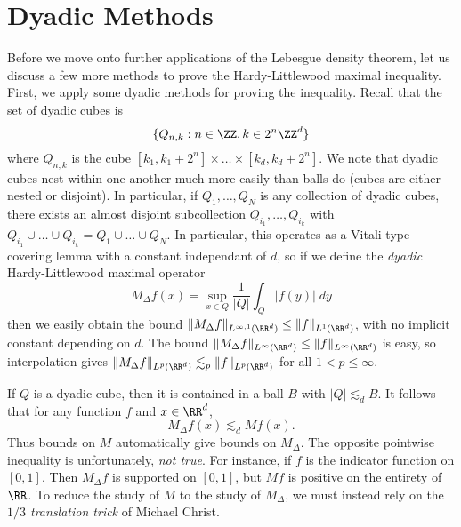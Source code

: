 \section{Dyadic Methods}

Before we move onto further applications of the Lebesgue density theorem, let us discuss a few more methods to prove the Hardy-Littlewood maximal inequality. First, we apply some dyadic methods for proving the inequality. Recall that the set of dyadic cubes is
%
\[ \{ Q_{n,k} : n \in \ZZ, k \in 2^n \ZZ^d \} \]
%
where $Q_{n,k}$ is the cube $[k_1, k_1 + 2^n] \times \dots \times [k_d, k_d + 2^n]$. We note that dyadic cubes nest within one another much more easily than balls do (cubes are either nested or disjoint). In particular, if $Q_1,\dots,Q_N$ is any collection of dyadic cubes, there exists an almost disjoint subcollection $Q_{i_1}, \dots, Q_{i_k}$ with $Q_{i_1} \cup \dots \cup Q_{i_k} = Q_1 \cup \dots \cup Q_N$. In particular, this operates as a Vitali-type covering lemma with a constant independant of $d$, so if we define the \emph{dyadic} Hardy-Littlewood maximal operator
%
\[ M_\Delta f(x) = \sup_{x \in Q} \frac{1}{|Q|} \int_Q |f(y)|\; dy \]
%
then we easily obtain the bound $\| M_\Delta f \|_{L^{\infty,1}(\RR^d)} \leq \| f \|_{L^1(\RR^d)}$, with no implicit constant depending on $d$. The bound $\| M_\Delta f \|_{L^\infty(\RR^d)} \leq \| f \|_{L^\infty(\RR^d)}$ is easy, so interpolation gives $\| M_\Delta f \|_{L^p(\RR^d)} \lesssim_p \| f \|_{L^p(\RR^d)}$ for all $1 < p \leq \infty$.

If $Q$ is a dyadic cube, then it is contained in a ball $B$ with $|Q| \lesssim_d B$. It follows that for any function $f$ and $x \in \RR^d$,
%
\[ M_\Delta f(x) \lesssim_d Mf(x). \]
%
Thus bounds on $M$ automatically give bounds on $M_\Delta$. The opposite pointwise inequality is unfortunately, \emph{not true}. For instance, if $f$ is the indicator function on $[0,1]$. Then $M_\Delta f$ is supported on $[0,1]$, but $Mf$ is positive on the entirety of $\RR$. To reduce the study of $M$ to the study of $M_\Delta$, we must instead rely on the \emph{$1/3$ translation trick} of Michael Christ.

